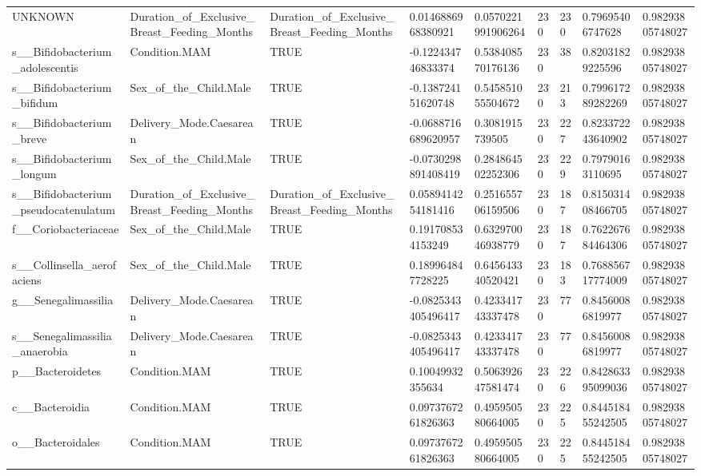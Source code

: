 \begin{longtable}{lllllllll}
UNKNOWN & Duration\_of\_Exclusive\_Breast\_Feeding\_Months & Duration\_of\_Exclusive\_Breast\_Feeding\_Months & 0.0146886968380921 & 0.0570221991906264 & 230 & 230 & 0.79695406747628 & 0.98293805748027 \\
s\_\_Bifidobacterium\_adolescentis & Condition.MAM & TRUE & -0.122434746833374 & 0.538408570176136 & 230 & 38 & 0.82031829225596 & 0.98293805748027 \\
s\_\_Bifidobacterium\_bifidum & Sex\_of\_the\_Child.Male & TRUE & -0.138724151620748 & 0.545851055504672 & 230 & 213 & 0.799617289282269 & 0.98293805748027 \\
s\_\_Bifidobacterium\_breve & Delivery\_Mode.Caesarean & TRUE & -0.0688716689620957 & 0.3081915739505 & 230 & 227 & 0.823372243640902 & 0.98293805748027 \\
s\_\_Bifidobacterium\_longum & Sex\_of\_the\_Child.Male & TRUE & -0.0730298891408419 & 0.284864502252306 & 230 & 229 & 0.79790163110695 & 0.98293805748027 \\
s\_\_Bifidobacterium\_pseudocatenulatum & Duration\_of\_Exclusive\_Breast\_Feeding\_Months & Duration\_of\_Exclusive\_Breast\_Feeding\_Months & 0.0589414254181416 & 0.251655706159506 & 230 & 187 & 0.815031408466705 & 0.98293805748027 \\
f\_\_Coriobacteriaceae & Sex\_of\_the\_Child.Male & TRUE & 0.191708534153249 & 0.632970046938779 & 230 & 187 & 0.762267684464306 & 0.98293805748027 \\
s\_\_Collinsella\_aerofaciens & Sex\_of\_the\_Child.Male & TRUE & 0.189964847728225 & 0.645643340520421 & 230 & 183 & 0.768856717774009 & 0.98293805748027 \\
g\_\_Senegalimassilia & Delivery\_Mode.Caesarean & TRUE & -0.0825343405496417 & 0.423341743337478 & 230 & 77 & 0.84560086819977 & 0.98293805748027 \\
s\_\_Senegalimassilia\_anaerobia & Delivery\_Mode.Caesarean & TRUE & -0.0825343405496417 & 0.423341743337478 & 230 & 77 & 0.84560086819977 & 0.98293805748027 \\
p\_\_Bacteroidetes & Condition.MAM & TRUE & 0.10049932355634 & 0.506392647581474 & 230 & 226 & 0.842863395099036 & 0.98293805748027 \\
c\_\_Bacteroidia & Condition.MAM & TRUE & 0.0973767261826363 & 0.495950580664005 & 230 & 225 & 0.844518455242505 & 0.98293805748027 \\
o\_\_Bacteroidales & Condition.MAM & TRUE & 0.0973767261826363 & 0.495950580664005 & 230 & 225 & 0.844518455242505 & 0.98293805748027 \\

\end{longtable}
